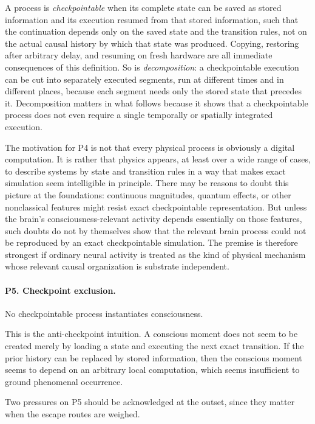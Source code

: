 \documentclass[11pt]{article}
\begin{document}
A process is \emph{checkpointable} when its complete state can be saved as
stored information and its execution resumed from that stored information,
such that the continuation depends only on the saved state and the transition
rules, not on the actual causal history by which that state was produced.
Copying, restoring after arbitrary delay, and resuming on fresh hardware are
all immediate consequences of this definition. So is \emph{decomposition}: a
checkpointable execution can be cut into separately executed segments, run at
different times and in different places, because each segment needs only the
stored state that precedes it. Decomposition matters in what follows because
it shows that a checkpointable process does not even require a single
temporally or spatially integrated execution.

The motivation for P4 is not that every physical process is obviously a digital
computation. It is rather that physics appears, at least over a wide range of
cases, to describe systems by state and transition rules in a way that makes
exact simulation seem intelligible in principle. There may be reasons to doubt
this picture at the foundations: continuous magnitudes, quantum effects, or
other nonclassical features might resist exact checkpointable representation.
But unless the brain's consciousness-relevant activity depends essentially on
those features, such doubts do not by themselves show that the relevant brain
process could not be reproduced by an exact checkpointable simulation. The
premise is therefore strongest if ordinary neural activity is treated as the
kind of physical mechanism whose relevant causal organization is substrate
independent.

\paragraph{P5. Checkpoint exclusion.}
No checkpointable process instantiates consciousness.

This is the anti-checkpoint intuition. A conscious moment does not seem to be
created merely by loading a state and executing the next exact transition. If
the prior history can be replaced by stored information, then the conscious
moment seems to depend on an arbitrary local computation, which seems
insufficient to ground phenomenal occurrence.

Two pressures on P5 should be acknowledged at the outset, since they matter
when the escape routes are weighed.
\end{document}
